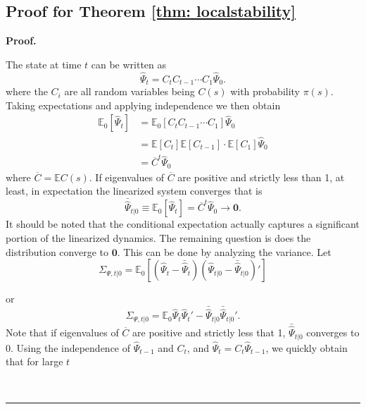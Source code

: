 \documentclass[thmsb,11pt]{article}
\newenvironment{proof}[1][Proof]{\noindent \textbf{#1.} }{\  \rule{0.5em}{0.5em}}
\begin{document}
\subsection{Proof for Theorem \ref{thm: localstability}}
\label{apndx: stability}
 \begin{proof}

 The state at time $t$ can be written as
 	\[
 		\hat{\Psi}_t = C_tC_{t-1}\cdots C_1\hat{\Psi}_0.
 	\]where the $C_i$ are all random variables being $C(s)$ with probability $\pi(s)$. Taking expectations and applying independence we then obtain
% 	
 	\begin{align}
 	\mathbb{E}_0[\hat{\Psi}_t] &= \mathbb{E}_0[C_tC_{t-1}\cdots C_1] \hat{\Psi}_0\\
 	&=\mathbb{E}[C_t] \mathbb{E}[C_{t-1}]\cdot\mathbb{E}[C_1] \hat{\Psi}_0\\
 	&=\overline C^t \hat{\Psi}_0
 	\end{align}
 	where $\overline C = \mathbb{E}C(s)$.  If eigenvalues of $\overline C$ are positive and strictly less than 1, at least, in expectation the linearized system converges that is
 	\begin{equation}
 		 \bar{\hat{\Psi}}_{t|0} \equiv \mathbb{E}_0[\hat{\Psi}_t] = \overline {C}^t \hat{\Psi}_0\to\bm 0.
 	\end{equation}It should be noted that the conditional expectation actually captures a significant portion of the linearized dynamics.
	The remaining question is does the distribution converge to $\bm 0$.  This can be done by analyzing the variance.  Let
 	\[
 		\Sigma_{\Psi,t|0} = \mathbb{E}_0\left[(\hat{\Psi}_t-\bar {\hat{\Psi}}_t)(\hat{\Psi}_{t|0}-\bar {\hat{\Psi}}_{t|0})'\right]
 	\]
 	
 	or
 	\begin{equation}
 	 \Sigma_{\Psi,t|0}=\mathbb{E}_{0}\hat{\Psi}_t\hat{\Psi}_t'- \bar{\hat{\Psi}}_{t|0} \bar{\hat{\Psi}}_{t|0} '.
 	\end{equation}
Note that  if eigenvalues of $\overline C$ are positive and strictly less that 1, $\bar{\hat{\Psi}}_{t|0} $ converges to 0.  Using the independence of $\hat{\Psi}_{t-1}$ and $C_t$, and $\hat{\Psi}_t = C_t \hat{\Psi}_{t-1}$, we quickly obtain that for large $t$
 	

\end{proof}
\end{document}
